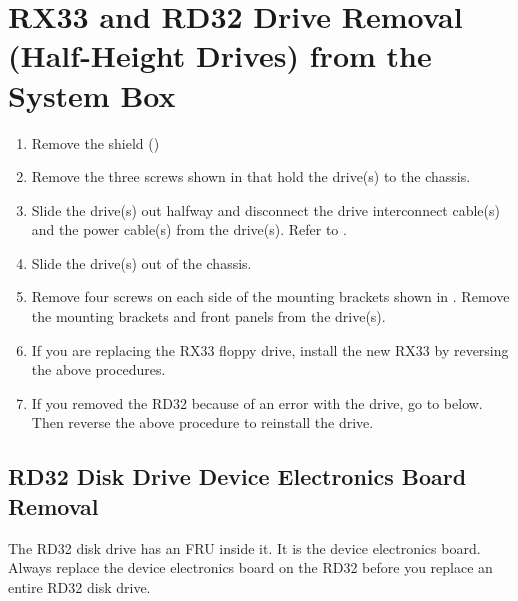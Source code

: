 \newpage

\section{RX33 and RD32 Drive Removal (Half-Height Drives) from the System Box}

\begin{enumerate}

\item	Remove the shield ()

\item	Remove the three screws shown in  that hold the drive(s) to
		the chassis.

\newpage

\item	Slide the drive(s) out halfway and disconnect the drive interconnect
		cable(s) and the power cable(s) from the drive(s). Refer to .


\item	Slide the drive(s) out of the chassis.
\newpage

\item	Remove four screws on each side of the mounting brackets shown in
		. Remove the mounting brackets and front panels from the
		drive(s).


\item	If you are replacing the RX33 floppy drive, install the new RX33 by
		reversing the above procedures.

\item	If you removed the RD32 because of an error with the drive, go to
		 below. Then reverse the 
		above procedure to reinstall the drive.

\end{enumerate}
\newpage

\subsection{RD32 Disk Drive Device Electronics Board Removal}

The RD32 disk drive has an FRU inside it. It is the device electronics board.
Always replace the device electronics board on the RD32 before you replace
an entire RD32 disk drive.

